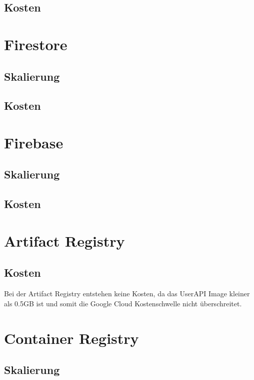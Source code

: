 \subsection*{Kosten}
\sblindtext


\section{Firestore}
\blindtext

\subsection*{Skalierung}
\blindtext

\subsection*{Kosten}
\sblindtext


\section{Firebase}
\blindtext

\subsection*{Skalierung}
\blindtext

\subsection*{Kosten}
\sblindtext


\section{Artifact Registry}
\blindtext
\subsection*{Kosten}
Bei der Artifact Registry entstehen keine Kosten, da das 
UserAPI Image kleiner als 0.5GB ist und somit die Google 
Cloud Kostenschwelle nicht überschreitet.
\sblindtext


\section{Container Registry}
\blindtext

\subsection*{Skalierung}
\blindtext

